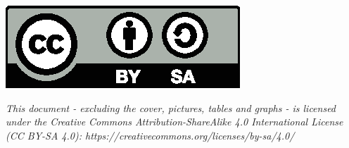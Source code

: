 \newpage
\thispagestyle{empty}

\vspace*{\fill} 

\noindent
\begin{minipage}[b]{\textwidth}

\includegraphics[scale=1]{License/by-sa.eps}
 
\textit{This document - excluding the cover, pictures, tables and graphs - is licensed under the Creative Commons Attribution-ShareAlike 4.0 International License (CC BY-SA 4.0): https://creativecommons.org/licenses/by-sa/4.0/}

\end{minipage}
\newpage



